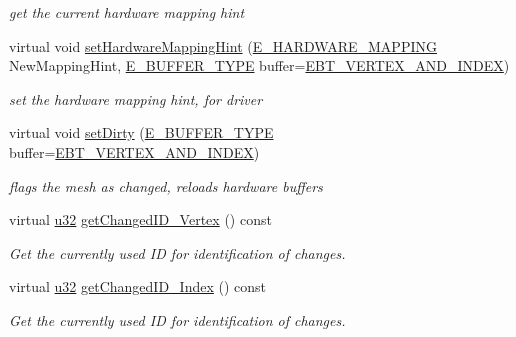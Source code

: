 \begin{DoxyCompactItemize}
\begin{DoxyCompactList}\small\item\em get the current hardware mapping hint \end{DoxyCompactList}\item 
\mbox{\label{structirr_1_1scene_1_1SSharedMeshBuffer_a0e0927ba679258099697688ac123af88}} 
virtual void \hyperlink{structirr_1_1scene_1_1SSharedMeshBuffer_a0e0927ba679258099697688ac123af88}{set\+Hardware\+Mapping\+Hint} (\hyperlink{namespaceirr_1_1scene_ac7d8ee8d77da75f2580bb9bb17231c27}{E\+\_\+\+H\+A\+R\+D\+W\+A\+R\+E\+\_\+\+M\+A\+P\+P\+I\+NG} New\+Mapping\+Hint, \hyperlink{namespaceirr_1_1scene_a8f59a89ffef0ad8e5b2c2cb874a93e8c}{E\+\_\+\+B\+U\+F\+F\+E\+R\+\_\+\+T\+Y\+PE} buffer=\hyperlink{namespaceirr_1_1scene_a8f59a89ffef0ad8e5b2c2cb874a93e8ca833624730c30cffccc121fe31aa0832c}{E\+B\+T\+\_\+\+V\+E\+R\+T\+E\+X\+\_\+\+A\+N\+D\+\_\+\+I\+N\+D\+EX})
\begin{DoxyCompactList}\small\item\em set the hardware mapping hint, for driver \end{DoxyCompactList}\item 
\mbox{\label{structirr_1_1scene_1_1SSharedMeshBuffer_ab49d4330e436e4e841e28aa867038e22}} 
virtual void \hyperlink{structirr_1_1scene_1_1SSharedMeshBuffer_ab49d4330e436e4e841e28aa867038e22}{set\+Dirty} (\hyperlink{namespaceirr_1_1scene_a8f59a89ffef0ad8e5b2c2cb874a93e8c}{E\+\_\+\+B\+U\+F\+F\+E\+R\+\_\+\+T\+Y\+PE} buffer=\hyperlink{namespaceirr_1_1scene_a8f59a89ffef0ad8e5b2c2cb874a93e8ca833624730c30cffccc121fe31aa0832c}{E\+B\+T\+\_\+\+V\+E\+R\+T\+E\+X\+\_\+\+A\+N\+D\+\_\+\+I\+N\+D\+EX})
\begin{DoxyCompactList}\small\item\em flags the mesh as changed, reloads hardware buffers \end{DoxyCompactList}\item 
virtual \hyperlink{namespaceirr_a0416a53257075833e7002efd0a18e804}{u32} \hyperlink{structirr_1_1scene_1_1SSharedMeshBuffer_ad9c7307fcad8c9b8db3db98f95863196}{get\+Changed\+I\+D\+\_\+\+Vertex} () const
\begin{DoxyCompactList}\small\item\em Get the currently used ID for identification of changes. \end{DoxyCompactList}\item 
virtual \hyperlink{namespaceirr_a0416a53257075833e7002efd0a18e804}{u32} \hyperlink{structirr_1_1scene_1_1SSharedMeshBuffer_a0a37d52f7ec9917d9ca0d9dd908917b9}{get\+Changed\+I\+D\+\_\+\+Index} () const
\begin{DoxyCompactList}\small\item\em Get the currently used ID for identification of changes. \end{DoxyCompactList}\end{DoxyCompactItemize}
